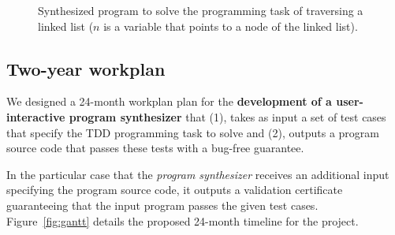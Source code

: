 \documentclass[10pt,a4paper]{paper}
\begin{document}
\begin{figure}[hbt!]
\begin{center}
\end{center}
\caption{\small Synthesized program to solve the programming task of traversing a linked list ($n$ is a variable that points to a node of the linked list).}
\label{fig:list}
\end{figure}



\subsection{Two-year workplan}
We designed a 24-month workplan plan for the {\bf development of a user-interactive program synthesizer} that (1), takes as input a set of test cases that specify the TDD programming task to solve and (2), outputs a program source code that passes these tests with a bug-free guarantee.

In the particular case that the {\em program synthesizer} receives an additional input specifying the program source code, it outputs a validation certificate guaranteeing that the input program passes the given test cases. Figure~\ref{fig:gantt} details the proposed 24-month timeline for the project.
\end{document}
